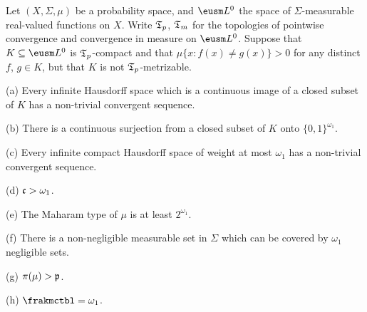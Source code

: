 Let $(X,\Sigma,\mu)$ be a probability space, and
$\eusm L^0$ the space of $\Sigma$-measurable real-valued functions on
$X$.   Write $\frak T_p$, $\frak T_m$ for the topologies of pointwise
convergence and convergence in measure on $\eusm L^0$.   Suppose that
$K\subseteq\eusm L^0$ is $\frak T_p$-compact and that
$\mu\{x:f(x)\ne g(x)\}>0$ for any distinct $f$, $g\in K$, but that $K$
is not $\frak T_p$-metrizable.

(a) Every infinite Hausdorff space which is a continuous image of a
closed subset of $K$ has a non-trivial convergent sequence.

(b) There is a continuous surjection from a closed subset of $K$ onto
$\{0,1\}^{\omega_1}$.

(c) Every infinite compact Hausdorff space of weight at most $\omega_1$
has a non-trivial convergent sequence.

(d) $\frak c>\omega_1$.

(e) The Maharam type of $\mu$ is at least $2^{\omega_1}$.

(f) There is a non-negligible measurable set in $\Sigma$ which can be
covered by $\omega_1$ negligible sets.

(g) $\pi(\mu)>\frak p$.

(h) $\frakmctbl=\omega_1$.

